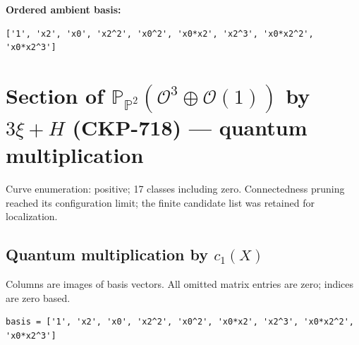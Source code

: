 \documentclass[10pt,a4paper]{article}
\begin{document}
\textbf{Ordered ambient basis:}
\begin{lstlisting}
['1', 'x2', 'x0', 'x2^2', 'x0^2', 'x0*x2', 'x2^3', 'x0*x2^2', 'x0*x2^3']
\end{lstlisting}

\clearpage\section*{Section of $\mathbb P_{\mathbb P^{2}}(\mathcal O^{3}\oplus \mathcal O(1))$ by $3\xi +H$ (CKP-718) --- quantum multiplication}

Curve enumeration: positive; 17 classes including zero.
Connectedness pruning reached its configuration limit; the finite candidate list was retained for localization.
\subsection*{Quantum multiplication by $c_1(X)$}
Columns are images of basis vectors. All omitted matrix entries are zero; indices are zero based.

\begin{lstlisting}
basis = ['1', 'x2', 'x0', 'x2^2', 'x0^2', 'x0*x2', 'x2^3', 'x0*x2^2', 'x0*x2^3']
\end{lstlisting}
\end{document}
